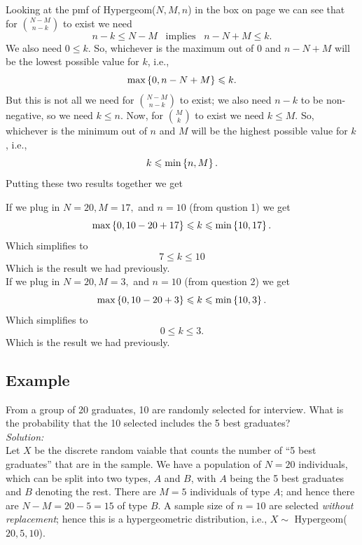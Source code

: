 \noindent Looking at the pmf of Hypergeom($N,M,n$) in the box on page \pageref{hypergeometric distribution} we can see that for $\binom{N-M}{n-k}$ to exist we need
\[
n - k \leq N - M \;\;\; \text{implies} \;\;\; n - N + M \leq k.
\]
We also need $0 \leq k$. So, whichever is the maximum out of $0$ and $n - N + M$ will be the lowest possible value for $k$, i.e., 
\[
\text{max}\left\{0,n - N + M\right\} \leqslant k.
\] 
But this is not all we need for $\binom{N-M}{n-k}$ to exist; we also need $n-k$ to be non-negative, so we need $k \leq n$. Now, for $\binom{M}{k}$ to exist we need $k \leq M$. So, whichever is the minimum out of $n$ and $M$ will be the highest possible value for $k$, i.e.,
\[
k \leqslant \text{min}\left\{n,M\right\}.
\] 
Putting these two results together we get

  	\bigskip
	
	\hfil{}
	\bigskip
	\bigskip

\noindent If we plug in $N  =20, M = 17,$ and $n = 10$ (from qustion 1) we get
\[
\text{max}\left\{0,10-20+17\right\} \leqslant k \leqslant \text{min}\left\{10,17\right\}.
\]
Which simplifies to
\[
7 \leq k \leq 10
\]
Which is the result we had previously. \\

\noindent If we plug in $N = 20, M = 3,$ and $n = 10$ (from question 2) we get
\[
\text{max}\left\{0,10-20+3\right\} \leqslant k \leqslant \text{min}\left\{10,3\right\}.
\]
Which simplifies to
\[
0 \leq k \leq 3.
\]
Which is the result we had previously.

\subsection{Example}
From a group of 20 graduates, 10 are randomly selected for interview. What is the probability that the 10 selected includes the 5 best graduates? \\

\noindent \textit{Solution:} \\
Let $X$ be the discrete random vaiable that counts the number of ``5 best graduates'' that are in the sample. We have a population of $N = 20$ individuals, which can be split into two types, $A$ and $B$, with $A$ being the 5 best graduates and $B$ denoting the rest. There are $M = 5$ individuals of type $A$; and hence there are $N - M = 20 - 5 = 15$ of type $B$. A sample size of $n =  10$ are selected \textit{without replacement}; hence this is a hypergeometric distribution, i.e., $X \sim $ Hypergeom($20,5,10$). \\


